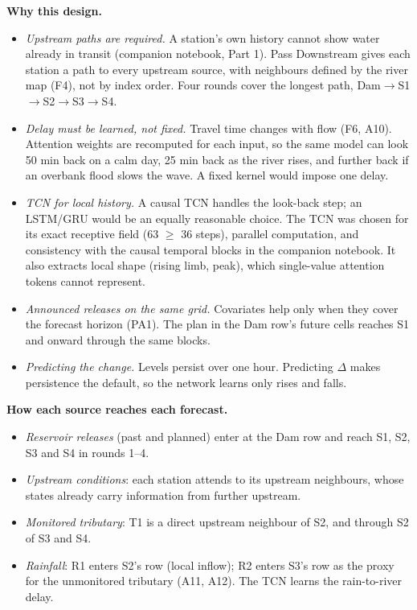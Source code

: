 \textbf{Why this design.}
\begin{itemize}
  \item \emph{Upstream paths are required.} A station's own history cannot show water already in transit (companion notebook, Part 1). Pass Downstream gives each station a path to every upstream source, with neighbours defined by the river map (F4), not by index order. Four rounds cover the longest path, Dam$\to$S1$\to$S2$\to$S3$\to$S4.
  \item \emph{Delay must be learned, not fixed.} Travel time changes with flow (F6, A10). Attention weights are recomputed for each input, so the same model can look 50 min back on a calm day, 25 min back as the river rises, and further back if an overbank flood slows the wave. A fixed kernel would impose one delay.
  \item \emph{TCN for local history.} A causal TCN handles the look-back step; an LSTM/GRU would be an equally reasonable choice. The TCN was chosen for its exact receptive field (63 $\ge$ 36 steps), parallel computation, and consistency with the causal temporal blocks in the companion notebook. It also extracts local shape (rising limb, peak), which single-value attention tokens cannot represent.
  \item \emph{Announced releases on the same grid.} Covariates help only when they cover the forecast horizon (PA1). The plan in the Dam row's future cells reaches S1 and onward through the same blocks.
  \item \emph{Predicting the change.} Levels persist over one hour. Predicting $\Delta$ makes persistence the default, so the network learns only rises and falls.
\end{itemize}

\textbf{How each source reaches each forecast.}
\begin{itemize}
  \item \emph{Reservoir releases} (past and planned) enter at the Dam row and reach S1, S2, S3 and S4 in rounds 1--4.
  \item \emph{Upstream conditions}: each station attends to its upstream neighbours, whose states already carry information from further upstream.
  \item \emph{Monitored tributary}: T1 is a direct upstream neighbour of S2, and through S2 of S3 and S4.
  \item \emph{Rainfall}: R1 enters S2's row (local inflow); R2 enters S3's row as the proxy for the unmonitored tributary (A11, A12). The TCN learns the rain-to-river delay.
\end{itemize}

